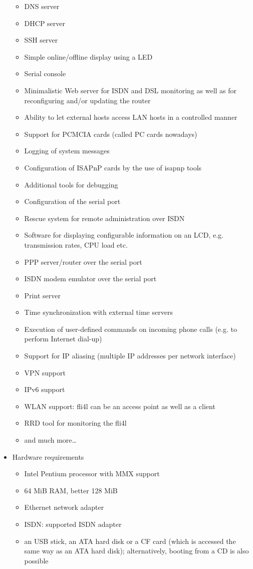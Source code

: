 \begin{itemize}
\begin{itemize}
\item DNS server
\item DHCP server
\item SSH server
\item Simple online/offline display using a LED
\item Serial console
\item Minimalistic Web server for ISDN and DSL monitoring as well as
      for reconfiguring and/or updating the router
\item Ability to let external hosts access LAN hosts in a controlled manner
\item Support for PCMCIA cards (called PC cards nowadays)
\item Logging of system messages
\item Configuration of ISAPnP cards by the use of isapnp tools
\item Additional tools for debugging
\item Configuration of the serial port
\item Rescue system for remote administration over ISDN
\item Software for displaying configurable information on an LCD, e.g.
      transmission rates, CPU load etc.
\item PPP server/router over the serial port
\item ISDN modem emulator over the serial port
\item Print server
\item Time synchronization with external time servers
\item Execution of user-defined commands on incoming phone calls (e.g.
      to perform Internet dial-up)
\item Support for IP aliasing (multiple IP addresses per network interface)
\item VPN support
\item IPv6 support
\item WLAN support: fli4l can be an access point as well as a client
\item RRD tool for monitoring the fli4l
\item and much more\ldots
\end{itemize}

\item Hardware requirements

\begin{itemize}
\item Intel Pentium processor with MMX support
\item 64 MiB RAM, better 128 MiB
\item Ethernet network adapter
\item ISDN: supported ISDN adapter
\item an USB stick, an ATA hard disk or a CF card (which is accessed the same
      way as an ATA hard disk); alternatively, booting from a CD is also
      possible
\end{itemize}


\end{itemize}
